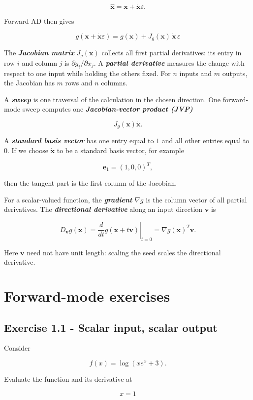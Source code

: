 \documentclass[10pt]{article}
\begin{document}
\[
\hat{\mathbf{x}}
=\mathbf{x}+\dot{\mathbf{x}}\varepsilon.
\]

Forward AD then gives

\[
{
 g(\mathbf{x}+\dot{\mathbf{x}}\varepsilon)
 = g(\mathbf{x}) + J_g(\mathbf{x})\,\dot{\mathbf{x}}\,\varepsilon
}
\]

The \textbf{\textit{Jacobian matrix}} $J_g(\mathbf{x})$ collects all first partial derivatives: its entry in row $i$ and column $j$ is $\partial g_i/\partial x_j$. A \textbf{\textit{partial derivative}} measures the change with respect to one input while holding the others fixed. For $n$ inputs and $m$ outputs, the Jacobian has $m$ rows and $n$ columns.

A \textbf{\textit{sweep}} is one traversal of the calculation in the chosen direction. One forward-mode sweep computes one \textbf{\textit{Jacobian-vector product (JVP)}}

\[
J_g(\mathbf{x})\dot{\mathbf{x}}.
\]

A \textbf{\textit{standard basis vector}} has one entry equal to $1$ and all other entries equal to $0$. If we choose $\dot{\mathbf{x}}$ to be a standard basis vector, for example

\[
\mathbf{e}_1=(1,0,0)^T,
\]

then the tangent part is the first column of the Jacobian.

For a scalar-valued function, the \textbf{\textit{gradient}} $\nabla g$ is the column vector of all partial derivatives. The \textbf{\textit{directional derivative}} along an input direction $\mathbf v$ is

\[
D_{\mathbf v}g(\mathbf x)=\left.\frac{d}{dt}g(\mathbf x+t\mathbf v)\right|_{t=0}=\nabla g(\mathbf x)^T\mathbf v.
\]

Here $\mathbf v$ need not have unit length: scaling the seed scales the directional derivative.

\section*{Forward-mode exercises}
\subsection*{Exercise 1.1 - Scalar input, scalar output}
Consider

\[
f(x)=\log\left(xe^x+3\right).
\]

Evaluate the function and its derivative at

\[
x=1
\]
\end{document}
